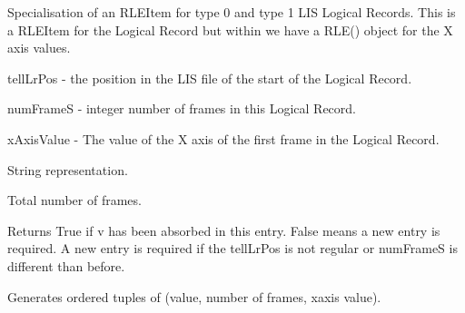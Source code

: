 \documentclass[letterpaper,10pt,english]{sphinxmanual}
\begin{document}
\begin{fulllineitems}
\label{\detokenize{ref/LIS/core/Rle:TotalDepth.LIS.core.Rle.RLEItemType01}}
Specialisation of an RLEItem for type 0 and type 1 LIS Logical Records.
This is a RLEItem for the Logical Record but within we have a RLE() object
for the X axis values.

tellLrPos - the position in the LIS file of the start of the Logical Record.

numFrameS - integer number of frames in this Logical Record.

xAxisValue - The value of the X axis of the first frame in the Logical Record.

\begin{fulllineitems}
\label{\detokenize{ref/LIS/core/Rle:TotalDepth.LIS.core.Rle.RLEItemType01.__str__}}
String representation.

\end{fulllineitems}


\begin{fulllineitems}
\label{\detokenize{ref/LIS/core/Rle:TotalDepth.LIS.core.Rle.RLEItemType01.numFrames}}
Total number of frames.

\end{fulllineitems}


\begin{fulllineitems}
\label{\detokenize{ref/LIS/core/Rle:TotalDepth.LIS.core.Rle.RLEItemType01.add}}
Returns True if v has been absorbed in this entry. False means a
new entry is required. A new entry is required if the tellLrPos is
not regular or numFrameS is different than before.

\end{fulllineitems}


\begin{fulllineitems}
\label{\detokenize{ref/LIS/core/Rle:TotalDepth.LIS.core.Rle.RLEItemType01.values}}
Generates ordered tuples of (value, number of frames, xaxis value).


\end{fulllineitems}
\end{fulllineitems}
\end{document}
